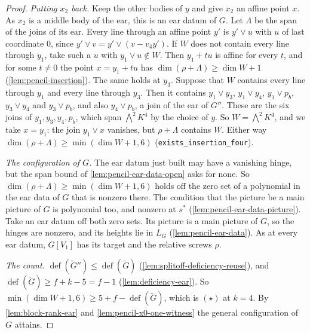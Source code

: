 \begin{proof}
  \emph{Putting $x_2$ back.} Keep the other bodies of $y$ and give $x_2$
  an affine point $x$. As $x_2$ is a middle body of the ear, this is an
  ear datum of $G$. Let $\Lambda$ be the span of the joins of its ear.
  Every line through an affine point $y'$ is $y' \vee u$ with $u$ of
  last coordinate $0$, since $y' \vee v = y' \vee (v - v_4 y')$. If
  $W$ does not contain every line through $y_1$, take such a $u$ with $y_1
  \vee u \notin W$. Then $y_1 + t u$ is affine for every $t$, and for
  some $t \neq 0$ the point $x = y_1 + t u$ has $\dim(\rho + \Lambda) \ge
  \dim W + 1$
  (\cref{lem:pencil-insertion}). The same holds at $y_3$. Suppose that
  $W$ contains every line through $y_1$ and every line through $y_3$.
  Then it contains $y_1 \vee y_3$, $y_1 \vee y_4$, $y_1 \vee p_b$,
  $y_3 \vee y_4$ and $y_3 \vee p_b$, and also $y_4 \vee p_b$, a join
  of the ear of $G''$. These are the six joins of $y_1, y_3, y_4, p_b$,
  which span $\bigwedge^2 K^4$ by the choice of $y$. So $W = \bigwedge^2 K^4$,
  and we take $x = y_1$: the join $y_1 \vee x$ vanishes, but
  $\rho + \Lambda$ contains $W$. Either way
  $\dim(\rho + \Lambda) \ge \min(\dim W + 1, 6)$
  (\texttt{exists\_insertion\_four}).

  \emph{The configuration of $G$.} The ear datum just built may have a
  vanishing hinge, but the span bound of \cref{lem:pencil-ear-data-open}
  asks for none. So $\dim(\rho + \Lambda) \ge \min(\dim W + 1, 6)$ holds
  off the zero set of a polynomial in the ear data of $G$ that is nonzero
  there. The condition that the picture be a main picture of $G$ is
  polynomial too, and nonzero at $s^*$ (\cref{lem:pencil-ear-data-picture}).
  Take an ear datum off both zero sets. Its picture is a main picture of
  $G$, so the hinges are nonzero, and its heights lie in $L_G$
  (\cref{lem:pencil-ear-data}). As at every ear datum, $G[V_1]$ has its
  target and the relative screws $\rho$.

  \emph{The count.} $\operatorname{def}(\tilde G'') \le
  \operatorname{def}(\tilde G)$ (\cref{lem:splitoff-deficiency-reuse}),
  and $\operatorname{def}(\tilde G) \ge f + k - 5 = f - 1$
  (\cref{lem:deficiency-ear}). So
  $\min(\dim W + 1, 6) \ge 5 + f - \operatorname{def}(\tilde G)$, which
  is $(\star)$ at $k = 4$. By \cref{lem:block-rank-ear} and
  \cref{lem:pencil-x0-one-witness} the general configuration of $G$
  attains.
\end{proof}


